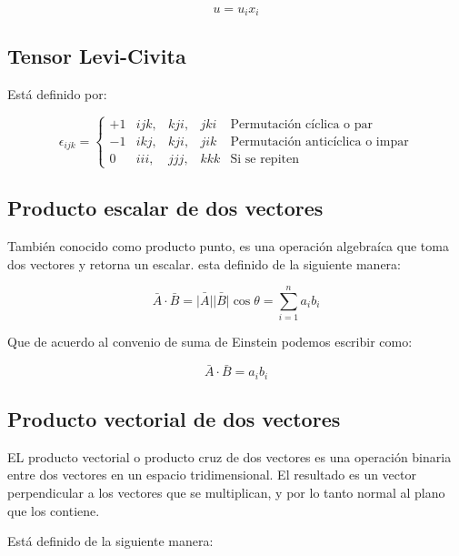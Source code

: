 \documentclass{article}
\providecommand{\abs}[1]{\lvert#1\rvert}
\begin{document}
\begin{equation}
    u = u_ix_i
\end{equation}

\subsection{Tensor Levi-Civita}
Está definido por:

\begin{equation}
    \epsilon_{ijk}=
    \left\lbrace\begin{array}{clllr} 
        +1 & ijk, & kji, & jki & \text{Permutación cíclica o par}\\ 
        -1 & ikj, & kji, & jik & \text{Permutación anticíclica o impar}\\
        0  & iii, & jjj, & kkk & \text{Si se repiten}
    \end{array}\right.
\end{equation}

\subsection{Producto escalar de dos vectores}

También conocido como producto punto, es una operación algebraíca que toma dos
vectores y retorna un escalar. esta definido de la siguiente manera:

\begin{equation}
    \bar{A} \cdot \bar{B}= \bar{\abs{A}} \bar{\abs{B}} \cos \theta
    = \sum_{i=1}^{n} a_i b_i
\end{equation}

Que de acuerdo al convenio de suma de Einstein podemos escribir como:

\begin{equation}
    \bar{A} \cdot \bar{B} = a_i b_i
\end{equation}

\subsection{Producto vectorial de dos vectores}

EL producto vectorial o producto cruz de dos vectores es una operación binaria
entre dos vectores en un espacio tridimensional. El resultado es un vector
perpendicular a los vectores que se multiplican, y por lo tanto normal al plano
que los contiene.

Está definido de la siguiente manera:
\end{document}
